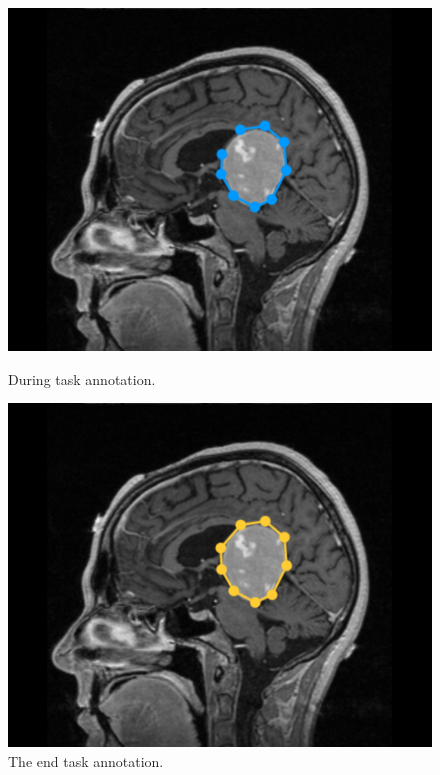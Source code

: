 \documentclass{sigchi}
\begin{document}
\begin{figure}[!tbp]
  \centering
  \begin{minipage}[b]{0.2\textwidth}
    \includegraphics[width=\textwidth]{screen2}
    \caption{During task annotation.}
    \label{fig:Fig4}
  \end{minipage}
  \hfill
  \begin{minipage}[b]{0.2\textwidth}
    \includegraphics[width=\textwidth]{screen3}
    \caption{The end task annotation.}
    \label{fig:Fig5}
  \end{minipage}
\end{figure}
\end{document}
